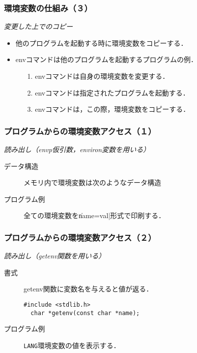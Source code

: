 \documentclass{beamer}                 %
\begin{document}
\begin{frame}[fragile]
  \frametitle{環境変数の仕組み（３）}
  \emph{変更した上でのコピー}
  \begin{itemize}
  \item 他のプログラムを起動する時に環境変数をコピーする．
  \item envコマンドは他のプログラムを起動するプログラムの例．
    \begin{enumerate}
    \item[1.] envコマンドは自身の環境変数を変更する．
    \item[2.] envコマンドは指定されたプログラムを起動する．
    \item[3.] envコマンドは，この際，環境変数をコピーする．
    \end{enumerate}
  \end{itemize}
\end{frame}

\begin{frame}[fragile]
  \frametitle{プログラムからの環境変数アクセス（１）}
  \emph{読み出し（envp仮引数，environ変数を用いる）}
  \begin{description}
  \item[データ構造] メモリ内で環境変数は次のようなデータ構造
  \item[プログラム例] 全ての環境変数を\|name=val|形式で印刷する．
  \end{description}
\end{frame}

\begin{frame}[fragile]
  \frametitle{プログラムからの環境変数アクセス（２）}
  \emph{読み出し（getenv関数を用いる）}
  \begin{description}
  \item [書式] getenv関数に変数名を与えると値が返る．
\begin{lstlisting}[numbers=none]
  #include <stdlib.h>
  char *getenv(const char *name);
\end{lstlisting}
  \item [プログラム例] \texttt{LANG}環境変数の値を表示する．
  \end{description}
\end{frame}
\end{document}
